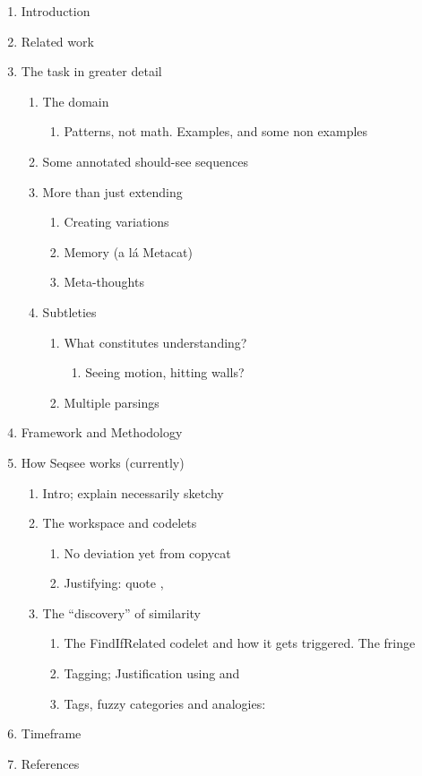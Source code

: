 \documentclass{article}
\begin{document}
\begin{enumerate}
\item Introduction
\item Related work
\item The task in greater detail
  \begin{enumerate}
  \item The domain
    \begin{enumerate}
    \item Patterns, not math. Examples, and some non examples
    \end{enumerate}
  \item Some annotated should-see sequences
  \item More than just extending
    \begin{enumerate}
    \item Creating variations
    \item Memory (a l\'a Metacat)
    \item Meta-thoughts
    \end{enumerate}
  \item Subtleties
    \begin{enumerate}
    \item What constitutes understanding?
      \begin{enumerate}
      \item Seeing motion, hitting walls?
      \end{enumerate}
    \item Multiple parsings
    \end{enumerate}
  \end{enumerate}
\item Framework and Methodology
\item How Seqsee works (currently)
  \begin{enumerate}
  \item Intro; explain necessarily sketchy
  \item The workspace and codelets
    \begin{enumerate}
    \item No deviation yet from copycat
    \item Justifying: quote \cite{Hofstadter:FCCA}, \cite{Hearsay}
    \end{enumerate}
  \item The ``discovery'' of similarity
    \begin{enumerate}
    \item The FindIfRelated codelet and how it gets triggered. The fringe \cite{James}
    \item Tagging; Justification using \cite{Clark:MagicWords} and \cite{Dennett:Labeling}
      \item Tags, fuzzy categories and analogies: \cite{Hofstadter:LeTon}
    \end{enumerate}
  \end{enumerate}
  
\item Timeframe
\item References

\end{enumerate}



\end{document}
